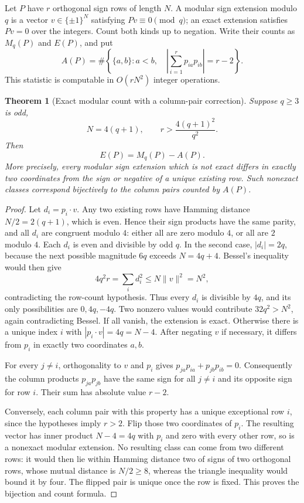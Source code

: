 \documentclass[11pt]{article}
\newtheorem{theorem}{Theorem}[section]
\begin{document}
Let $P$ have $r$ orthogonal sign rows of length $N$. A modular sign
extension modulo $q$ is a vector $v\in\{\pm1\}^N$ satisfying
$Pv\equiv0\pmod q$; an exact extension satisfies $Pv=0$ over the
integers. Count both kinds up to negation. Write their counts as
$M_q(P)$ and $E(P)$, and put
\[
 A(P)=\#\left\{\{a,b\}:a<b,\quad
 \left|\sum_{i=1}^r p_{ia}p_{ib}\right|=r-2\right\}.
\]
This statistic is computable in $O(rN^2)$ integer operations.

\begin{theorem}[Exact modular count with a column-pair correction]
Suppose $q\ge3$ is odd,
\[
 N=4(q+1),\qquad r>\frac{4(q+1)^2}{q^2}.
\]
Then
\[
 \boxed{E(P)=M_q(P)-A(P).}
\]
More precisely, every modular sign extension which is not exact differs
in exactly two coordinates from the sign or negative of a unique
existing row. Such nonexact classes correspond bijectively to the
column pairs counted by $A(P)$.
\end{theorem}
\begin{proof}
Let $d_i=p_i\cdot v$. Any two existing rows have Hamming distance
$N/2=2(q+1)$, which is even. Hence their sign products have the same
parity, and all $d_i$ are congruent modulo $4$: either all are zero
modulo $4$, or all are $2$ modulo $4$.
Each $d_i$ is even and divisible by odd $q$. In the second case,
$|d_i|=2q$, because the next possible magnitude $6q$ exceeds
$N=4q+4$. Bessel's inequality would then give
\[
 4q^2r=\sum_i d_i^2\le N\|v\|^2=N^2,
\]
contradicting the row-count hypothesis.
Thus every $d_i$ is divisible by $4q$, and its only possibilities
are $0,4q,-4q$. Two nonzero values would contribute
$32q^2>N^2$, again contradicting Bessel. If all vanish, the extension
is exact. Otherwise there is a unique index $i$ with
$|p_i\cdot v|=4q=N-4$. After negating $v$ if necessary, it differs
from $p_i$ in exactly two coordinates $a,b$.

For every $j\ne i$, orthogonality to $v$ and $p_i$ gives
$p_{ja}p_{ia}+p_{jb}p_{ib}=0$. Consequently the column products
$p_{ja}p_{jb}$ have the same sign for all $j\ne i$ and its opposite
sign for row $i$. Their sum has absolute value $r-2$.

Conversely, each column pair with this property has a unique exceptional
row $i$, since the hypotheses imply $r>2$. Flip those two coordinates
of $p_i$. The resulting vector has inner product $N-4=4q$ with
$p_i$ and zero with every other row, so is a nonexact modular extension.
No resulting class can come from two different rows: it would then
lie within Hamming distance two of signs of two orthogonal rows,
whose mutual distance is $N/2\ge8$, whereas the triangle inequality
would bound it by four. The flipped pair is unique once the row is
fixed. This proves the bijection and count formula.
\end{proof}
\end{document}

